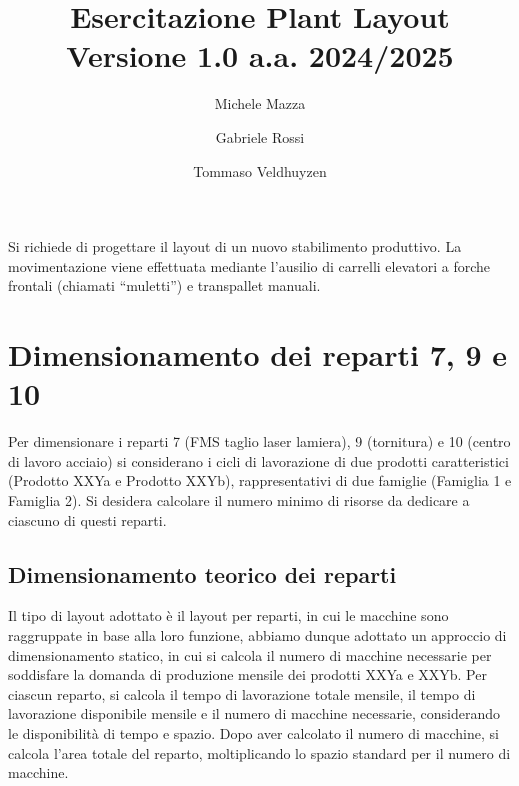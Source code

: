\documentclass[a4paper,12pt]{article}
\title{Esercitazione Plant Layout\\Versione 1.0 a.a. 2024/2025}
\author{%
  Michele Mazza
    \and
  Gabriele Rossi
   \and
  Tommaso Veldhuyzen
}
\date{}
\begin{document}
\maketitle

Si richiede di progettare il layout di un nuovo stabilimento produttivo. 
La movimentazione viene effettuata mediante l’ausilio di carrelli elevatori a forche frontali (chiamati ``muletti'') e transpallet manuali.

\section{Dimensionamento dei reparti 7, 9 e 10}
Per dimensionare i reparti 7 (FMS taglio laser lamiera), 9 (tornitura) e 10 (centro di lavoro acciaio) si considerano i cicli di lavorazione di due prodotti caratteristici (Prodotto XXYa e Prodotto XXYb), rappresentativi di due famiglie (Famiglia 1 e Famiglia 2). 
Si desidera calcolare il numero minimo di risorse da dedicare a ciascuno di questi reparti.
\subsection{Dimensionamento teorico dei reparti}
Il tipo di layout adottato è il layout per reparti, in cui le macchine sono raggruppate in base alla loro funzione, abbiamo dunque adottato un approccio di dimensionamento statico, in cui si calcola il numero di macchine necessarie per soddisfare la domanda di produzione mensile dei prodotti XXYa e XXYb.
Per ciascun reparto, si calcola il tempo di lavorazione totale mensile, il tempo di lavorazione disponibile mensile e il numero di macchine necessarie, considerando le disponibilità di tempo e spazio.
Dopo aver calcolato il numero di macchine, si calcola l'area totale del reparto, moltiplicando lo spazio standard per il numero di macchine.
\end{document}
